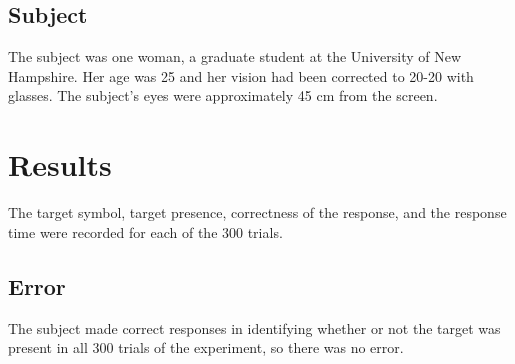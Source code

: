 \documentclass{article} %
\begin{document}
\begin{table}
	\caption{Average response times of the different trial types in seconds.}
	\label{tab:averages}
\end{table}

\subsection{Subject}

The subject was one woman, a graduate student at the University of New Hampshire.  Her age was 25 and her vision had been corrected to 20-20 with glasses.  The subject's eyes were approximately 45 cm from the screen.

\section{Results}

The target symbol, target presence, correctness of the response, and the response time were recorded for each of the 300 trials.  

\subsection{Error}

The subject made correct responses in identifying whether or not the target was present in all 300 trials of the experiment, so there was no error.
\end{document}

